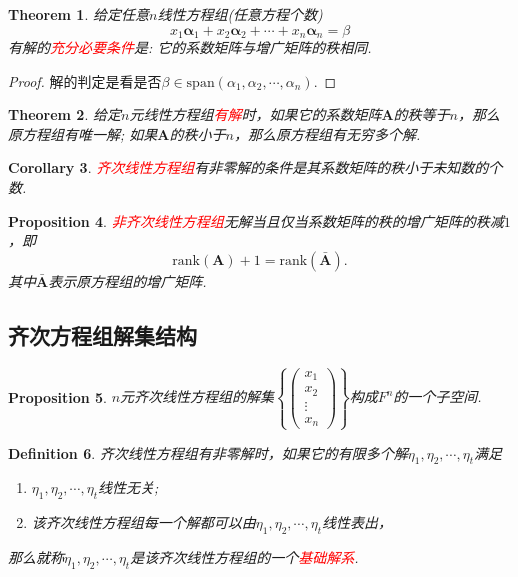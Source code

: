 \documentclass{article}
\newtheorem{theorem}{Theorem}[section]
\newtheorem{corollary}[theorem]{Corollary}
\newtheorem{proposition}[theorem]{Proposition}
\newtheorem{definition}[theorem]{Definition}
\newcommand{\vect}[1]{\mathbf{#1}} %
\newcommand{\mbf}[1]{\bm{#1}}
\newcommand{\rank}[1]{\text{rank}\left(#1\right)} %
\newcommand{\redt}[1]{\textcolor{red}{#1}}
\begin{document}
\begin{theorem}
\rm 给定任意$n$线性方程组(任意方程个数)
$$
x_1 \vect{\alpha}_1 + x_2 \vect{\alpha}_2 + \cdots + x_n \vect{\alpha}_n = \beta
$$
有解的\redt{充分必要条件}是: 它的系数矩阵与增广矩阵的秩相同.
\end{theorem}

\begin{proof}
解的判定是看是否$\beta \in \text{span}(\alpha_1,\alpha_2,\cdots,\alpha_n)$. 
\end{proof}

\begin{theorem}
\rm 给定$n$元线性方程组\redt{有解}时，如果它的系数矩阵$\mbf{A}$的秩等于$n$，那么原方程组有唯一解; 如果$\mbf{A}$的秩小于$n$，那么原方程组有无穷多个解.
\end{theorem}

\begin{corollary}
\rm \redt{齐次线性方程组}有非零解的条件是其系数矩阵的秩小于未知数的个数.
\end{corollary}


\begin{proposition}
\rm \redt{非齐次线性方程组}无解当且仅当系数矩阵的秩的增广矩阵的秩减$1$，即
$$
\rank{\mbf{A}} + 1 = \rank{\bar{\mbf{A}}}.
$$ 
其中$\bar{\mbf{A}}$表示原方程组的增广矩阵. 
\end{proposition}

\subsection{齐次方程组解集结构}

\begin{proposition}
\rm $n$元齐次线性方程组的解集$\left\{\begin{pmatrix}
x_1\\
x_2\\
\vdots \\
x_n
\end{pmatrix}\right\}$构成$F^n$的一个子空间.
\end{proposition}

\begin{definition}
\rm 齐次线性方程组有非零解时，如果它的有限多个解$\eta_1,\eta_2,\cdots,\eta_t$满足
\begin{enumerate}
	\item $\eta_1,\eta_2,\cdots,\eta_t$线性无关;
	\item 该齐次线性方程组每一个解都可以由$\eta_1,\eta_2,\cdots,\eta_t$线性表出，
\end{enumerate}
那么就称$\eta_1,\eta_2,\cdots,\eta_t$是该齐次线性方程组的一个\redt{基础解系}.
\end{definition}
\end{document}

